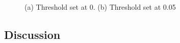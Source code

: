\documentclass[twoside]{report}
\begin{document}
\begin{spacing}{1}
\begin{figure}[!h]
\begin{minipage}{.5\linewidth}
\centering
{}
\end{minipage}%
\begin{minipage}{.5\linewidth}
\centering
{}
\end{minipage}\par\medskip
\centering
\caption{(a) Threshold set at 0. (b) Threshold set at 0.05}
\label{fig:pnl_naji102}
\end{figure}

\subsection{Discussion}


\end{spacing}
\end{document}
